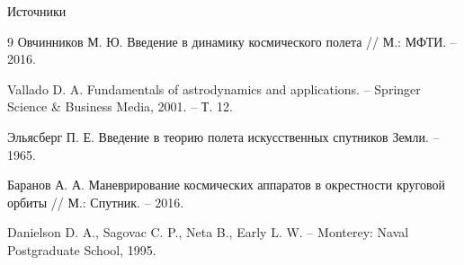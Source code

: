 \documentclass[11pt,aspectratio=169,t]{beamer}
\begin{document}
\begin{frame}{Источники}
\begin{thebibliography}{9}
Овчинников М. Ю. Введение в динамику космического полета // М.: МФТИ. – 2016.

Vallado D. A. Fundamentals of astrodynamics and applications. – Springer Science \& Business Media, 2001. – Т. 12.

Эльясберг П. Е. Введение в теорию полета искусственных спутников Земли. – 1965.

Баранов А. А. Маневрирование космических аппаратов в окрестности круговой орбиты // М.: Спутник. – 2016.

Danielson D. A., Sagovac C. P., Neta B., Early L. W. – Monterey: Naval Postgraduate School, 1995.
\end{thebibliography}
\end{frame}
\end{document}
